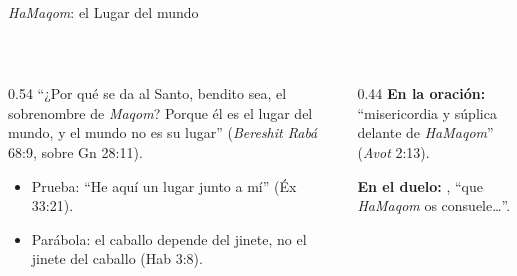 \begin{frame}{\emph{HaMaqom}: el Lugar del mundo}
\begin{center}\scriptsize{}\\[1pt]\end{center}
\begin{columns}[t,onlytextwidth]
\begin{column}{0.54\textwidth}\small
``¿Por qué se da al Santo, bendito sea, el sobrenombre de \emph{Maqom}? Porque él es el lugar del mundo, y el mundo no es su lugar'' (\emph{Bereshit Rabá} 68:9, sobre Gn 28:11).
\begin{itemize}
\item Prueba: ``He aquí un lugar junto a mí'' (Éx 33:21).
\item Parábola: el caballo depende del jinete, no el jinete del caballo (Hab 3:8).
\end{itemize}
\end{column}
\begin{column}{0.44\textwidth}\scriptsize
\textbf{En la oración:} ``misericordia y súplica delante de \emph{HaMaqom}'' (\emph{Avot} 2:13).\par\smallskip
\textbf{En el duelo:} , ``que \emph{HaMaqom} os consuele\ldots''.\par\smallskip
{}
\end{column}
\end{columns}
\end{frame}

